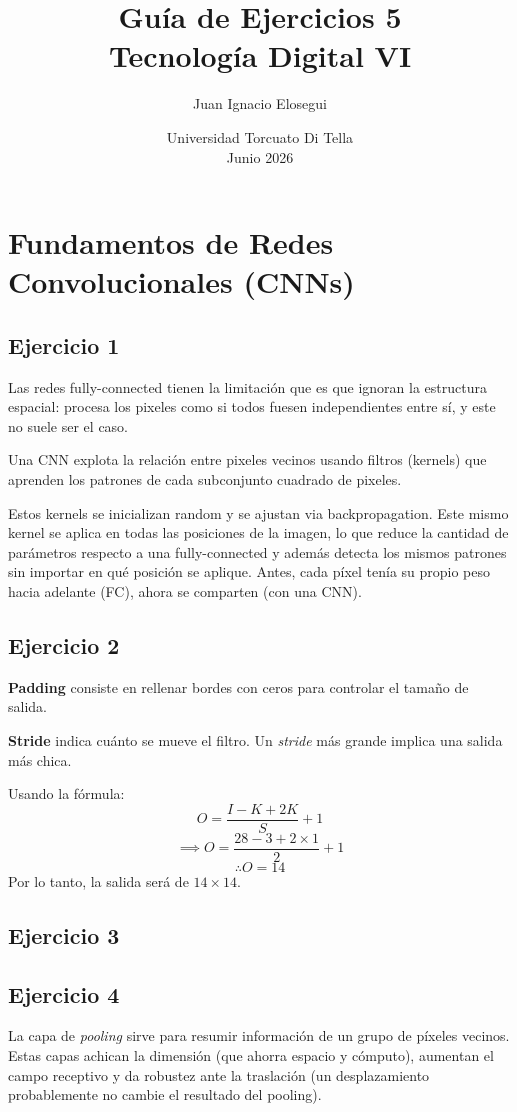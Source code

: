 \documentclass[a4paper,11pt]{article}
\title{\vspace{-2cm}\textbf{Guía de Ejercicios 5}\\[0.2cm]
\large Tecnología Digital VI}
\author{Juan Ignacio Elosegui}
\date{Universidad Torcuato Di Tella \\ Junio 2026}
\begin{document}
\maketitle
\section*{Fundamentos de Redes Convolucionales (CNNs)}
\subsection*{Ejercicio 1}
Las redes fully-connected tienen la limitación que es que ignoran la estructura espacial: procesa los pixeles como si todos fuesen independientes entre sí, y este no suele ser el caso.

Una CNN explota la relación entre pixeles vecinos usando filtros (kernels) que aprenden los patrones de cada subconjunto cuadrado de pixeles.

Estos kernels se inicializan random y se ajustan via backpropagation. Este mismo kernel se aplica en todas las posiciones de la imagen, lo que reduce la cantidad de parámetros respecto a una fully-connected y además detecta los mismos patrones sin importar en qué posición se aplique. Antes, cada píxel tenía su propio peso hacia adelante (FC), ahora se comparten (con una CNN).
\subsection*{Ejercicio 2}
\textbf{Padding} consiste en rellenar bordes con ceros para controlar el tamaño de salida.

\textbf{Stride} indica cuánto se mueve el filtro. Un \textit{stride} más grande implica una salida más chica.

Usando la fórmula:
\[O = \frac{I-K+2K}{S}+1\]
\[\implies O = \frac{28-3+2 \times 1}{2}+1\]
\[\therefore O = 14\]
Por lo tanto, la salida será de $14 \times 14$.
\subsection*{Ejercicio 3}

\subsection*{Ejercicio 4}
La capa de \textit{pooling} sirve para resumir información de un grupo de píxeles vecinos. Estas capas achican la dimensión (que ahorra espacio y cómputo), aumentan el campo receptivo y da robustez ante la traslación (un desplazamiento probablemente no cambie el resultado del pooling).
\end{document}
